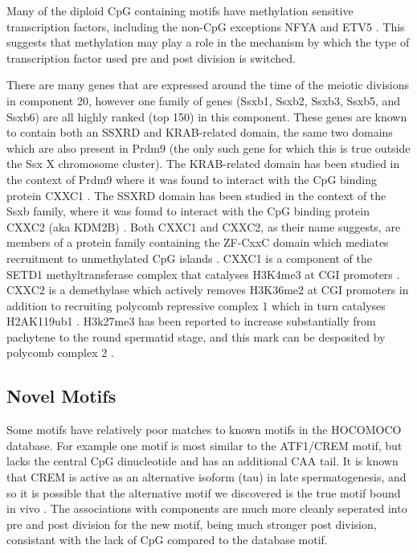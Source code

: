 Many of the diploid CpG containing motifs have methylation sensitive transcription factors, including the non-CpG exceptions NFYA and ETV5 \parencite{Domcke2015Competition, Wang2017NRF1}. This suggests that methylation may play a role in the mechanism by which the type of transcription factor used pre and post division is switched.

There are many genes that are expressed around the time of the meiotic divisions in component 20, however one family of genes (Ssxb1, Ssxb2, Ssxb3, Ssxb5, and Ssxb6) are all highly ranked (top 150) in this component. These genes are known to contain both an SSXRD and KRAB-related domain, the same two domains which are also present in Prdm9 (the only such gene for which this is true outside the Ssx X chromosome cluster). The KRAB-related domain has been studied in the context of Prdm9 where it was found to interact with the CpG binding protein CXXC1 \parencite{Imai2017PRDM9, Parvanov2017PRDM9}. The SSXRD domain has been studied in the context of the Ssxb family, where it was found to interact with the CpG binding protein CXXC2 (aka KDM2B) \parencite{Banito2018SS18SSX}. Both CXXC1 and CXXC2, as their name suggests, are members of a protein family containing the ZF-CxxC domain which mediates recruitment to unmethylated CpG islands \parencite[reviewed in]{Long2013ZFCxxC}. CXXC1 is a component of the SETD1 methyltransferase complex that catalyses H3K4me3 at CGI promoters \parencite{Lee2005CpGbinding}. CXXC2 is a demethylase which actively removes H3K36me2 at CGI promoters in addition to recruiting polycomb repressive complex 1 which in turn catalyses H2AK119ub1 \parencite{He2008H3K36, Farcas2012KDM2B, He2013Kdm2b, Wu2013Fbxl10}. H3k27me3 has been reported to increase substantially from pachytene to the round spermatid stage, and this mark can be desposited by polycomb complex 2 \parencite{Sin2015Poised}.


  
\subsection{Novel Motifs}

Some motifs have relatively poor matches to known motifs in the HOCOMOCO database. For example one motif is most similar to the ATF1/CREM motif, but lacks the central CpG dinucleotide and has an additional CAA tail. It is known that CREM is active as an alternative isoform (tau) in late spermatogenesis, and so it is possible that the alternative motif we discovered is the true motif bound in vivo \parencite{Sassone-Corsi2000CREM}. The associations with components are much more cleanly seperated into pre and post division for the new motif, being much stronger post division, consistant with the lack of CpG compared to the database motif.

